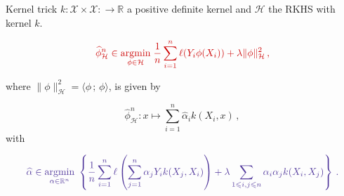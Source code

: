 \documentclass[9pt]{beamer}
\newcommand{\ind}[1]{\mathbf{1}_{#1}}
\DeclareMathOperator*{\argmin}{argmin}%
\newcommand{\R}{\mathbb{R}}
\newcommand{\eqsp}{\,}
\newcommand{\inr}[1]{\langle #1 \rangle}
\newcommand{\norm}[1]{\|#1\|}
\begin{document}
\begin{frame}{Kernel trick}
$k:\mathcal{X}\times\mathcal{X}:\to \mathbb{R}$ a positive definite kernel and $\mathcal{H}$ the RKHS with kernel $k$. 

\vspace{.1cm}
 
\[
\textcolor{lightr}{\widehat \phi^n_{\mathcal{H}} \in \underset{\phi\in\mathcal{H}}{\argmin}\;\frac{1}{n}\sum_{i=1}^n \ell(Y_i\phi(X_i)) + \lambda\|\phi\|_\mathcal{H}^2\,,}
\]

\vspace{.1cm}

where $\|\phi\|^2_\mathcal{H} = \langle \phi\eqsp;\eqsp \phi\rangle$, is given by 

\vspace{.1cm}

\[
\widehat \phi^n_{\mathcal{H}} : x \mapsto \sum_{i=1}^n \widehat \alpha_i k(X_i,x)\,,
\]
with

\vspace{.1cm}

\[
\textcolor{violet}{\widehat\alpha \in \underset{\alpha \in \mathbb{R}^n}{\argmin}\;\left\{\frac{1}{n}\sum_{i=1}^n \ell\left(\sum_{j=1}^n\alpha_jY_ik(X_j,X_i)\right) + \lambda \sum_{1\leqslant i,j \leqslant n}\alpha_i \alpha_j k(X_i,X_j)\right\}\,.}
\]
\end{frame}
%
%
\end{document}

